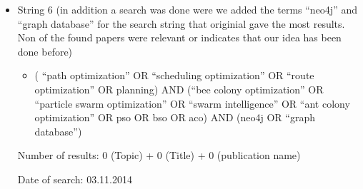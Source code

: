 \begin{itemize}
\item String 6 (in addition a search was done were we added the terms ``neo4j'' and ``graph database'' for the search string that originial gave the most results. Non of the found papers were relevant or indicates that our idea has been done before)
\begin{itemize}
\item ( ``path optimization'' OR ``scheduling optimization'' OR ``route optimization'' OR planning) AND (``bee colony optimization'' OR ``particle swarm optimization'' OR ``swarm intelligence'' OR ``ant colony optimization'' OR pso OR bso OR aco) AND (neo4j OR ``graph database'')
\end{itemize}
\par
Number of results:  0 (Topic) + 0 (Title) + 0 (publication name)
\par
Date of search: 03.11.2014
\end{itemize}

